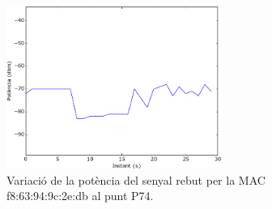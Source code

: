 \begin{figure}[ht]
\begin{center}
\includegraphics[width=7cm]{imatges/fluctuacio.png}
\caption{Variació de la potència del senyal rebut per la MAC f8:63:94:9c:2e:db al punt P74.}
\label{fig:fluctuacio}
\end{center}
\end{figure}
